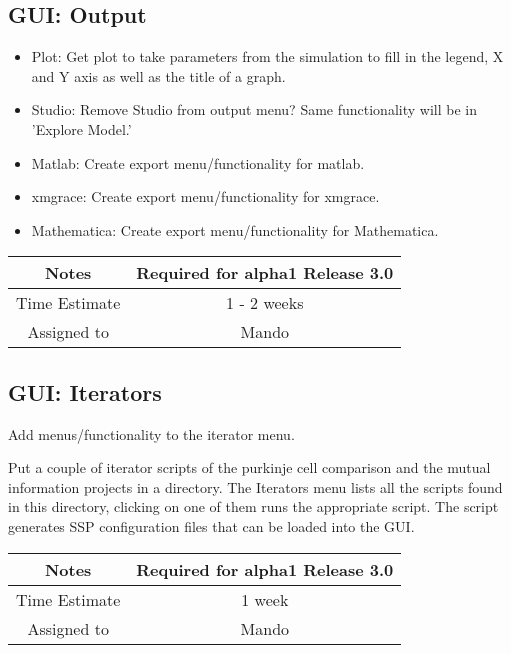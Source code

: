 \documentclass[12pt]{article}
\begin{document}
\subsection{GUI: Output}
\begin{itemize}
\item Plot: Get plot to take parameters from the simulation to fill in
  the legend, X and Y axis as well as the title of a graph.
\item Studio: Remove Studio from output menu? Same functionality will
  be in 'Explore Model.'
\item Matlab: Create export menu/functionality for matlab.
\item xmgrace: Create export menu/functionality for xmgrace.
\item Mathematica: Create export menu/functionality for Mathematica.
\end{itemize}

{
  \vspace{5mm}
  \centering
  \begin{tabular}{|c|c|}
    \hline
    Notes
    & Required for alpha1 Release 3.0 \\
    \hline
    Time Estimate
    & 1 - 2 weeks \\
    \hline
    Assigned to
    & Mando \\
    \hline
  \end{tabular}
}


\subsection{GUI: Iterators}
Add menus/functionality to the iterator menu.

Put a couple of iterator scripts of the purkinje cell comparison and
the mutual information projects in a directory.  The Iterators menu
lists all the scripts found in this directory, clicking on one of them
runs the appropriate script.  The script generates SSP configuration
files that can be loaded into the GUI.

{
  \vspace{5mm}
  \centering
  \begin{tabular}{|c|c|}
    \hline
    Notes
    & Required for alpha1 Release 3.0 \\
    \hline
    Time Estimate
    & 1 week \\
    \hline
    Assigned to
    & Mando \\
    \hline
  \end{tabular}
}
\end{document}

